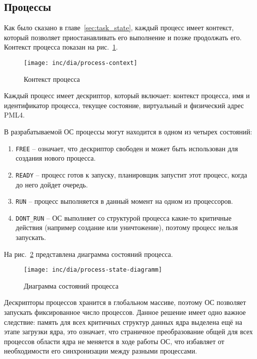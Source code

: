\subsection{Процессы}
Как было сказано в главе~\ref{sec:task_state}, каждый процесс имеет контекст, который позволяет
приостанавливать его выполнение и позже продолжать его. Контекст процесса показан
на рис.~\ref{fig:process-context}.

\begin{figure}[ht!]
  \centering
  \texttt{[image: inc/dia/process-context]}
  \caption{Контекст процесса}
  \label{fig:process-context}
\end{figure}

Каждый процесс имеет дескриптор, который включает: контекст процесса, имя и идентификатор процесса,
текущее состояние, виртуальный и физический адрес PML4.

В разрабатываемой ОС процессы могут находится в одном из четырех состояний:
\begin{enumerate}[1.]
\item \texttt{FREE} -- означает, что дескриптор свободен и может быть использован
	для создания нового процесса.
\item \texttt{READY} -- процесс готов к запуску, планировщик запустит этот процесс,
	когда до него дойдет очередь.
\item \texttt{RUN} -- процесс выполняется в данный момент на одном из процессоров.
\item \texttt{DONT\_RUN} -- ОС выполняет со структурой процесса какие-то критичные действия
	(например создание или уничтожение), поэтому процесс нельзя запускать.
\end{enumerate}

На рис.~\ref{fig:process-state-diagramm} представлена диаграмма состояний процесса.

\begin{figure}[ht!]
  \centering
  \texttt{[image: inc/dia/process-state-diagramm]}
  \caption{Диаграмма состояний процесса}
  \label{fig:process-state-diagramm}
\end{figure}


Дескрипторы процессов хранится в глобальном массиве, поэтому ОС позволяет запускать
фиксированное число процессов. Данное решение имеет одно важное следствие: память
для всех критичных структур данных ядра выделена ещё на этапе загрузки ядра, это
означает, что страничное преобразование общей для всех процессов области ядра не
меняется в ходе работы ОС, что избавляет от необходимости его синхронизации
между разными процессами.

